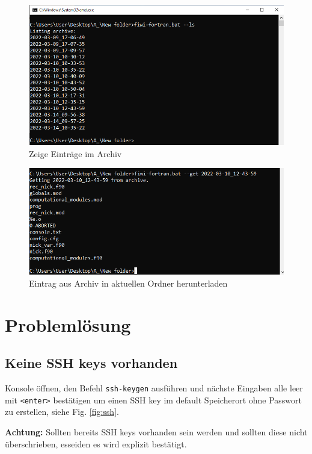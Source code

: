 \documentclass[11pt, a4paper]{article}
\begin{document}
\begin{figure}[h]
    \centering
    \includegraphics[width=0.7\linewidth]{./pics/2022-03-16_16-31.png}
    \caption{Zeige Einträge im Archiv}
    \label{fig:web-1}
\end{figure}
\begin{figure}[h]
    \centering
    \includegraphics[width=0.7\linewidth]{./pics/2022-03-16_16-33_1.png}
    \caption{Eintrag aus Archiv in aktuellen Ordner herunterladen}
    \label{fig:web-1}
\end{figure}



\clearpage
\section{Problemlösung}

\subsection{Keine SSH keys vorhanden}\label{sec:ssh}
Konsole öffnen, den Befehl \texttt{ssh-keygen} ausführen und nächste Eingaben alle leer mit \texttt{<enter>} bestätigen um einen SSH key im default Speicherort ohne Passwort zu erstellen, siehe Fig. \ref{fig:ssh}.

\textbf{Achtung:} Sollten bereits SSH keys vorhanden sein werden und sollten diese nicht überschrieben, esseiden es wird explizit bestätigt.
\end{document}
